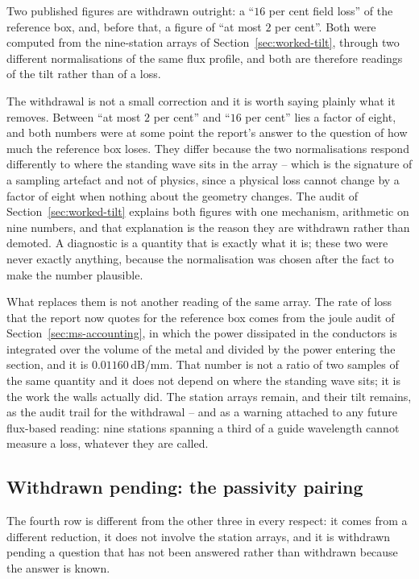 Two published figures are withdrawn outright: a ``$16$ per cent field loss'' of the reference box, and, before
that, a figure of ``at most $2$ per cent''. Both were computed from the nine-station arrays of
Section~\ref{sec:worked-tilt}, through two different normalisations of the same flux profile, and both are
therefore readings of the tilt rather than of a loss.

The withdrawal is not a small correction and it is worth saying plainly what it removes. Between ``at most $2$
per cent'' and ``$16$ per cent'' lies a factor of eight, and both numbers were at some point the report's answer
to the question of how much the reference box loses. They differ because the two normalisations respond
differently to where the standing wave sits in the array -- which is the signature of a sampling artefact and not
of physics, since a physical loss cannot change by a factor of eight when nothing about the geometry changes.
The audit of Section~\ref{sec:worked-tilt} explains both figures with one mechanism, arithmetic on nine
numbers, and that explanation is the reason they are withdrawn rather than demoted. A diagnostic is a quantity
that is exactly what it is; these two were never exactly anything, because the normalisation was chosen after
the fact to make the number plausible.

What replaces them is not another reading of the same array. The rate of loss that the report now quotes for the
reference box comes from the joule audit of Section~\ref{sec:ms-accounting}, in which the power dissipated in
the conductors is integrated over the volume of the metal and divided by the power entering the section, and it
is $0.01160$\,dB/mm. That number is not a ratio of two samples of the same quantity and it does not depend on
where the standing wave sits; it is the work the walls actually did. The station arrays remain, and their tilt
remains, as the audit trail for the withdrawal -- and as a warning attached to any future flux-based reading:
nine stations spanning a third of a guide wavelength cannot measure a loss, whatever they are called.

\subsection{Withdrawn pending: the passivity pairing}
\label{sec:worked-pairing}

The fourth row is different from the other three in every respect: it comes from a different reduction, it does
not involve the station arrays, and it is withdrawn pending a question that has not been answered rather than
withdrawn because the answer is known.

